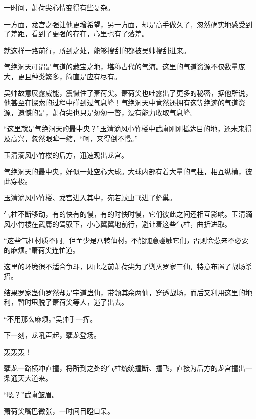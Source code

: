 \begin{this_body}
一时间，萧荷尖心情变得有些复杂。

一方面，龙宫之强让他更增希望，另一方面，却是高手做久了，忽然确实地感受到了差距，看到了更强的存在，心里也有了落差。

就这样一路前行，所到之处，能够搜刮的都被吴帅搜刮进来。

气绝洞天可谓是气道的藏宝之地，堪称古代的气海。这里的气道资源不仅数量庞大，更且种类繁多，简直是应有尽有。

吴帅故意展露威能，震慑住了萧荷尖。萧荷尖也吐露出了更多的秘密，据他所说，他甚至在探索的过程中碰到过气息峰！气绝洞天中竟然还拥有这等绝迹的气道资源，遗憾的是，萧荷尖也只是匆匆一瞥，没有能力收取气息峰。

“这里就是气绝洞天的最中央？”玉清滴风小竹楼中武庸刚刚抵达目的地，还未来得及高兴，忽然眼眸一缩，“呵，来得倒不慢。”

玉清滴风小竹楼的后方，迅速现出龙宫。

气绝洞天的最中央，好似一处空心大球。大球内部有着大量的气柱，相互纵横，彼此穿梭。

玉清滴风小竹楼、龙宫进入其中，宛若蚊虫飞进了蜂巢。

气柱不断移动，有的快有的慢，有的时快时慢，它们彼此之间还相互影响。玉清滴风小竹楼在武庸的驾驭下，小心翼翼地前行，避让着这些气柱，曲折进取。

“这些气柱材质不同，但至少是八转仙材。不能随意碰触它们，否则会惹来不必要的麻烦。”萧荷尖连忙道。

这里的环境很不适合争斗，因此之前萧荷尖为了剿灭罗家三仙，特意布置了战场杀招。

结果罗家蛊仙罗然却是宇道蛊仙，带领其余两仙，穿透战场，而后又利用这里的地利，暂时甩脱了萧荷尖等人，逃了出去。

“不用那么麻烦。”吴帅手一挥。

下一刻，龙吼声起，孽龙登场。

轰轰轰！

孽龙一路横冲直撞，将所到之处的气柱统统撞断、撞飞，直接为后方的龙宫撞出一条通天大道来。

“嗯？”武庸皱眉。

萧荷尖嘴巴微张，一时间目瞪口呆。

\end{this_body}

